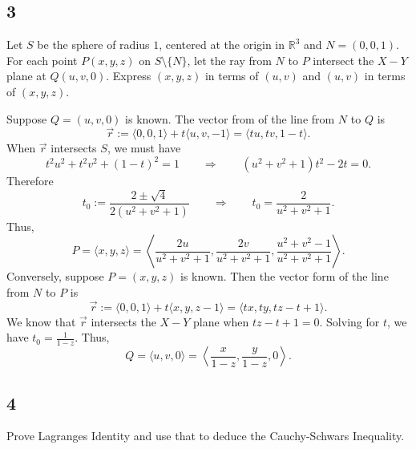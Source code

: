 \documentclass[12pt]{article}
\begin{document}
\subsection*{3}
\begin{tcolorbox}
Let $S$ be the sphere of radius $1$, centered at the origin in $\mathbb{R}^{3}$ and $N = (0,0,1)$. For each point $P(x,y,z)$ on $S\setminus \{N\}$,
let the ray from $N$ to $P$ intersect the $X-Y$ plane at $Q(u,v,0)$. Express $(x,y,z)$ in terms of $(u,v)$ and $(u,v)$ in terms of $(x,y,z)$.
\end{tcolorbox}

Suppose $Q = (u,v,0)$ is known. The vector from of the line from $N$ to $Q$ is 
\[ \vec{r} := \langle 0,0,1\rangle + t\langle u,v,-1\rangle = \langle tu, tv, 1-t\rangle. \]
When $\vec{r}$ intersects $S$, we must have 
\[ t^{2}u^{2} + t^{2}v^{2} + (1-t)^{2} = 1 \qquad \Rightarrow \qquad (u^{2} + v^{2} + 1)t^{2} - 2t = 0. \]
Therefore
\[ t_{0} := \frac{2\pm \sqrt{4}}{2(u^{2} + v^{2} + 1)} \qquad \Rightarrow \qquad t_{0} = \frac{2}{u^{2} + v^{2} + 1}. \]
Thus,
\[ P = \langle x,y,z \rangle = \left\langle \frac{2u}{u^{2} + v^{2} + 1}, \frac{2v}{u^{2} + v^{2} + 1}, \frac{u^{2} + v^{2} - 1}{u^{2} + v^{2} + 1}\right\rangle.
\]
Conversely, suppose $P = (x,y,z)$ is known. Then the vector form of the line from $N$ to $P$ is 
\[ \vec{r} := \langle 0,0,1 \rangle + t\langle x,y,z-1 \rangle = \langle tx,ty,tz-t+1\rangle. \]
We know that $\vec{r}$ intersects the $X-Y$ plane when $tz - t + 1 = 0$. Solving for $t$, we have $t_{0} = \frac{1}{1-z}$. Thus,
\[ Q = \langle u,v,0 \rangle = \left\langle \frac{x}{1-z}, \frac{y}{1-z}, 0 \right\rangle. \]












\newpage
\subsection*{4}
\begin{tcolorbox}
Prove Lagranges Identity and use that to deduce the Cauchy-Schwars Inequality.
\end{tcolorbox}
\end{document}
